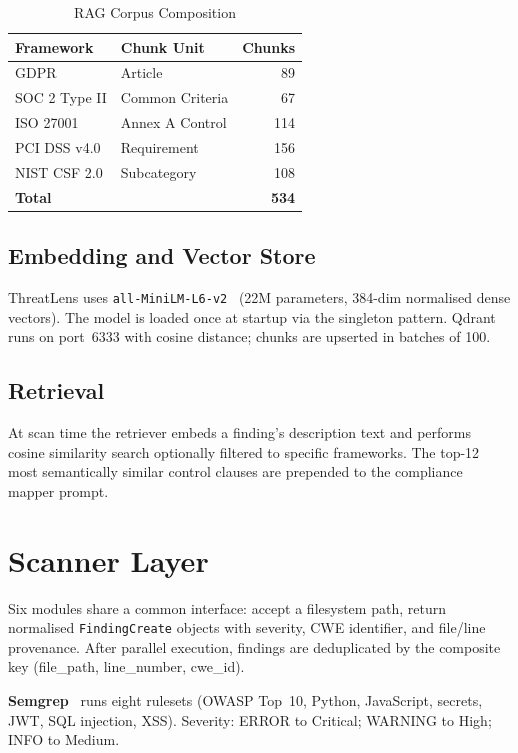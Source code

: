 \documentclass[conference]{IEEEtran}
\begin{document}
\begin{table}[htbp]
\centering
\caption{RAG Corpus Composition}
\label{tab:corpus}
\scriptsize
\begin{tabular}{@{}llr@{}}
\toprule
\textbf{Framework} & \textbf{Chunk Unit} & \textbf{Chunks} \\
\midrule
GDPR             & Article               &  89  \\
SOC 2 Type II    & Common Criteria       &  67  \\
ISO 27001        & Annex A Control       & 114  \\
PCI DSS v4.0     & Requirement           & 156  \\
NIST CSF 2.0     & Subcategory           & 108  \\
\midrule
\textbf{Total}   &                       & \textbf{534} \\
\bottomrule
\end{tabular}
\end{table}

\subsection{Embedding and Vector Store}
ThreatLens uses \texttt{all-MiniLM-L6-v2}~\cite{reimers2019} (22M
parameters, 384-dim normalised dense vectors). The model is loaded once
at startup via the singleton pattern. Qdrant~\cite{qdrant} runs on
port~6333 with cosine distance; chunks are upserted in batches of 100.

\subsection{Retrieval}
At scan time the retriever embeds a finding's description text and
performs cosine similarity search optionally filtered to specific
frameworks. The top-12 most semantically similar control clauses are
prepended to the compliance mapper prompt.

\section{Scanner Layer}
\label{sec:scanners}

Six modules share a common interface: accept a filesystem path, return
normalised \texttt{FindingCreate} objects with severity, CWE identifier,
and file/line provenance. After parallel execution, findings are
deduplicated by the composite key (file\_path, line\_number, cwe\_id).

\textbf{Semgrep}~\cite{semgrep} runs eight rulesets (OWASP Top~10,
Python, JavaScript, secrets, JWT, SQL injection, XSS). Severity:
ERROR to Critical; WARNING to High; INFO to Medium.
\end{document}
